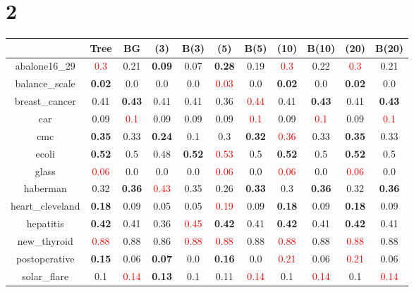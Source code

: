 \documentclass{article}%
\begin{document}
\section*{2}%
\begin{tabular}{c|cccccccccc}%
\hline%
&Tree&BG&(3)&B(3)&(5)&B(5)&(10)&B(10)&(20)&B(20)\\%
\hline%
abalone16\_29&\textcolor{red}{ 
0.3
}&0.21&\textbf{0.09}&0.07&\textbf{0.28}&0.19&\textcolor{red}{ 
0.3
}&0.22&\textcolor{red}{ 
0.3
}&0.21\\%
\hline%
balance\_scale&\textbf{0.02}&0.0&0.0&0.0&\textcolor{red}{ 
0.03
}&0.0&\textbf{0.02}&0.0&\textbf{0.02}&0.0\\%
\hline%
breast\_cancer&0.41&\textbf{0.43}&0.41&0.41&0.36&\textcolor{red}{ 
0.44
}&0.41&\textbf{0.43}&0.41&\textbf{0.43}\\%
\hline%
car&0.09&\textcolor{red}{ 
0.1
}&0.09&0.09&0.09&\textcolor{red}{ 
0.1
}&0.09&\textcolor{red}{ 
0.1
}&0.09&\textcolor{red}{ 
0.1
}\\%
\hline%
cmc&\textbf{0.35}&0.33&\textbf{0.24}&0.1&0.3&\textbf{0.32}&\textcolor{red}{ 
0.36
}&0.33&\textbf{0.35}&0.33\\%
\hline%
ecoli&\textbf{0.52}&0.5&0.48&\textbf{0.52}&\textcolor{red}{ 
0.53
}&0.5&\textbf{0.52}&0.5&\textbf{0.52}&0.5\\%
\hline%
glass&\textcolor{red}{ 
0.06
}&0.0&0.0&0.0&\textcolor{red}{ 
0.06
}&0.0&\textcolor{red}{ 
0.06
}&0.0&\textcolor{red}{ 
0.06
}&0.0\\%
\hline%
haberman&0.32&\textbf{0.36}&\textcolor{red}{ 
0.43
}&0.35&0.26&\textbf{0.33}&0.3&\textbf{0.36}&0.32&\textbf{0.36}\\%
\hline%
heart\_cleveland&\textbf{0.18}&0.09&0.05&0.05&\textcolor{red}{ 
0.19
}&0.09&\textbf{0.18}&0.09&\textbf{0.18}&0.09\\%
\hline%
hepatitis&\textbf{0.42}&0.41&0.36&\textcolor{red}{ 
0.45
}&\textbf{0.42}&0.41&\textbf{0.42}&0.41&\textbf{0.42}&0.41\\%
\hline%
new\_thyroid&\textcolor{red}{ 
0.88
}&0.88&0.86&\textcolor{red}{ 
0.88
}&\textcolor{red}{ 
0.88
}&0.88&\textcolor{red}{ 
0.88
}&0.88&\textcolor{red}{ 
0.88
}&0.88\\%
\hline%
postoperative&\textbf{0.15}&0.06&\textbf{0.07}&0.0&\textbf{0.16}&0.0&\textcolor{red}{ 
0.21
}&0.06&\textcolor{red}{ 
0.21
}&0.06\\%
\hline%
solar\_flare&0.1&\textcolor{red}{ 
0.14
}&\textbf{0.13}&0.1&0.11&\textcolor{red}{ 
0.14
}&0.1&\textcolor{red}{ 
0.14
}&0.1&\textcolor{red}{ 
0.14
}\\%

\end{tabular}
\end{document}
